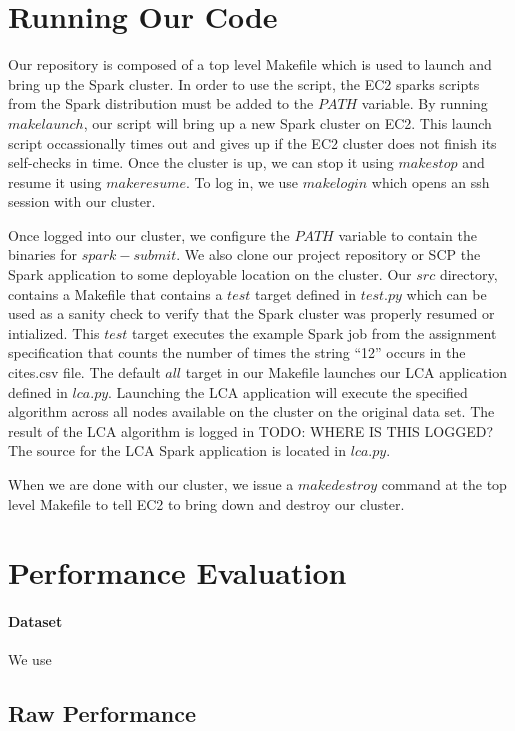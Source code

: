 \documentclass{article}
\begin{document}
\section{Running Our Code}

Our repository is composed of a top level Makefile which is used to launch and bring up the Spark cluster.
In order to use the script, the EC2 sparks scripts from the Spark distribution must be added to the $PATH$ variable.
By running $make launch$, our script will bring up a new Spark cluster on EC2.
This launch script occassionally times out and gives up if the EC2 cluster does not finish its self-checks in time.
Once the cluster is up, we can stop it using $make stop$ and resume it using $make resume$.
To log in, we use $make login$ which opens an ssh session with our cluster.

Once logged into our cluster, we configure the $PATH$ variable to contain the binaries for $spark-submit$.
We also clone our project repository or SCP the Spark application to some deployable location on the cluster.
Our $src$ directory, contains a Makefile that contains a $test$ target defined in $test.py$ which can be used as a sanity check to verify that the Spark cluster was properly resumed or intialized.
This $test$ target executes the example Spark job from the assignment specification that counts the number of times the string ``12'' occurs in the cites.csv file.
The default $all$ target in our Makefile launches our LCA application defined in $lca.py$.
Launching the LCA application will execute the specified algorithm across all nodes available on the cluster on the original data set.
The result of the LCA algorithm is logged in TODO: WHERE IS THIS LOGGED?
The source for the LCA Spark application is located in $lca.py$.

When we are done with our cluster, we issue a $make destroy$ command at the top level Makefile to tell EC2 to bring down and destroy our cluster.

\section{Performance Evaluation}

\paragraph{Dataset}
We use 

\subsection{Raw Performance}
\end{document}

